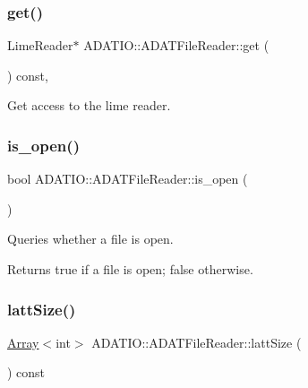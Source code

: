 \subsubsection{\texorpdfstring{get()}{get()}}
{\footnotesize\ttfamily Lime\+Reader$\ast$ A\+D\+A\+T\+I\+O\+::\+A\+D\+A\+T\+File\+Reader\+::get (\begin{DoxyParamCaption}{ }\end{DoxyParamCaption}) const\hspace{0.3cm}{\ttfamily [inline]}, {\ttfamily [protected]}}



Get access to the lime reader. 

\mbox{\label{classADATIO_1_1ADATFileReader_ga601972c66a6e6671d7b41ee1bce80e82}} 
\subsubsection{\texorpdfstring{is\_open()}{is\_open()}}
{\footnotesize\ttfamily bool A\+D\+A\+T\+I\+O\+::\+A\+D\+A\+T\+File\+Reader\+::is\+\_\+open (\begin{DoxyParamCaption}{ }\end{DoxyParamCaption})}



Queries whether a file is open. 

\begin{DoxyReturn}{Returns}
true if a file is open; false otherwise. 
\end{DoxyReturn}
\mbox{\label{classADATIO_1_1ADATFileReader_ga3498ab9948d446056dee8f2808e05c78}} 
\subsubsection{\texorpdfstring{lattSize()}{lattSize()}}
{\footnotesize\ttfamily \mbox{\hyperlink{classXMLArray_1_1Array}{Array}}$<$int$>$ A\+D\+A\+T\+I\+O\+::\+A\+D\+A\+T\+File\+Reader\+::latt\+Size (\begin{DoxyParamCaption}{ }\end{DoxyParamCaption}) const\hspace{0.3cm}{\ttfamily [inline]}}



